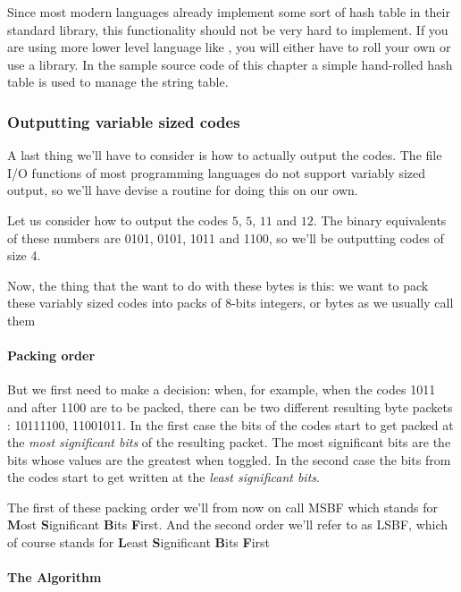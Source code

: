 \begin{refsection}
Since most modern languages already implement some sort of hash table
in their standard library, this functionality should not be very hard
to implement. If you are using more lower level language like \C, you
will either have to roll your own or use a library. In the sample \C
source code of this chapter a simple hand-rolled hash table
is used to manage the string table.

\subsubsection{Outputting variable sized codes}

A last thing we'll have to consider is how to actually output the
codes. The file I/O functions of most programming languages do not
support variably sized output, so we'll have devise a routine for doing
this on our own.

Let us consider how to output the codes $5$, $5$, $11$ and $12$. The
binary equivalents of these numbers are 0101, 0101,
1011 and 1100, so we'll be outputting codes of size 4.

Now, the thing that the want to do with these bytes is this: we want
to pack these variably sized codes into packs of 8-bits integers, or
bytes as we usually call them

\paragraph{Packing order}

But we first need to make a decision: when, for example, when the
codes 1011 and after 1100 are to be packed, there can be
two different resulting byte packets : 10111100,
11001011. In the first case the bits of the codes start to get
packed at the \textit{most significant bits} of the resulting packet.
The most significant bits are the bits whose values are the greatest
when toggled. In the second case the bits from the codes start to get
written at the \textit{least significant bits}.

The first of these packing order we'll from now on call
MSBF which stands for \textbf{M}ost \textbf{S}ignificant
\textbf{B}its \textbf{F}irst. And the second order we'll refer to as
LSBF, which of course stands for \textbf{L}east
\textbf{S}ignificant \textbf{B}its \textbf{F}irst

\paragraph{The Algorithm}


\end{refsection}
